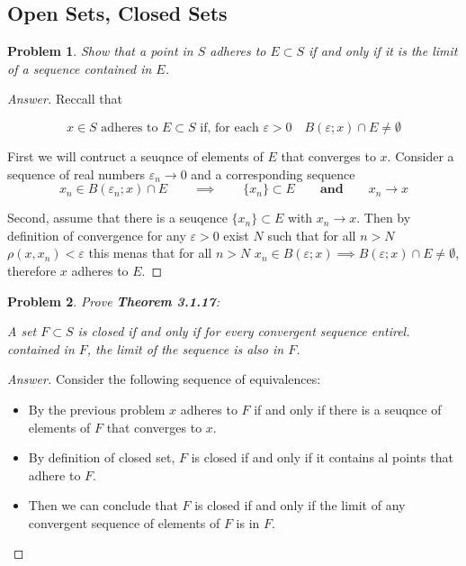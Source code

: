 \documentclass{article}
\newtheorem{problem}{Problem}
\newcommand{\qiq}{\qquad \implies \qquad}
\newcommand{\qaq}{\qquad \textbf{and} \qquad}
\begin{document}
\subsection{Open Sets, Closed Sets}
\begin{problem}
    Show that a point in $S$ adheres to $E \subset S$ if and only if it is the limit of a sequence contained in $E$.
\end{problem}

\begin{proof}[Answer]
    Reccall that

    $$x \in S \text { adheres to } E \subset S \text { if, for each } \varepsilon>0 \quad  B(\varepsilon ; x)\cap E \neq \emptyset$$

    First we will contruct a seuqnce of elements of $E$ that converges to $x$. Consider a sequence of real numbers $\varepsilon_n \to 0$ and a corresponding sequence 
    $$x_n \in B(\varepsilon_n ; x)\cap E \qiq \{x_n\}\subset E \qaq x_n \to x$$

    Second, assume that there is a seuqence $\{x_n\}\subset E$ with $x_n \to x$. Then by definition of convergence for any $\varepsilon>0$ exist $N$ such that for all $n>N$ $\rho(x, x_n)<\varepsilon$ this menas that for all $n>N$ $x_n \in  B(\varepsilon; x) \implies B(\varepsilon; x) \cap E \neq \emptyset$, therefore $x$ adheres to $E$. 
\end{proof}

\begin{problem}
    Prove \textbf{Theorem 3.1.17}:

        A set $F \subset S$ is closed if and only if for every convergent sequence entirel. contained in $F$, the limit of the sequence is also in $F$.
\end{problem}


\begin{proof}[Answer]
    Consider the following sequence of equivalences: 
    \begin{itemize}
        \item By the previous problem $x$ adheres to $F$ if and only if there is a seuqnce of elements of $F$ that converges to $x$.
        \item By definition of closed set, $F$ is closed if and only if it contains al points that adhere to $F$.
        \item Then we can conclude that $F$ is closed if and only if the limit of any convergent sequence of elements of $F$ is in $F$.
    \end{itemize}
    
\end{proof}
\end{document}
